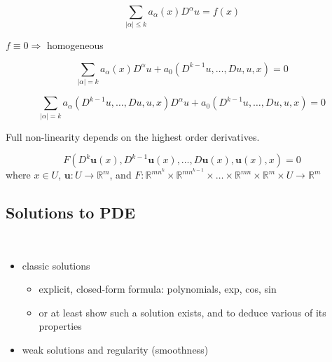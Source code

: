 \documentclass{article}
\begin{document}
\begin{definition}
    \begin{equation}
        \label{eq:linear-pde}
        \sum_{|\alpha| \leq k} a_{\alpha}(x) D^{\alpha} u = f(x)
    \end{equation}

    $f \equiv 0 \Rightarrow$ homogeneous
\end{definition}

\begin{definition}
    \begin{equation}
        \label{eq:semi-linear}
        \sum_{|\alpha| = k} a_{\alpha}(x) D^{\alpha}u + a_{0} (D^{k-1}u, \dots, Du, u, x) = 0
    \end{equation}
\end{definition}

\begin{definition}
    \begin{equation}
        \label{eq:quasi-linear}
        \sum_{|\alpha| = k} a_{\alpha}(D^{k-1}u, \dots, Du, u, x) D^{\alpha}u + a_{0} (D^{k-1}u, \dots, Du, u, x) = 0
    \end{equation}
\end{definition}

\begin{remark}[nonlinear]
    Full non-linearity depends on the highest order derivatives.
\end{remark}

\begin{definition}
    \begin{equation}
        \label{eq:pde-system}
        F(D^{k}\boldsymbol{u}(x), D^{k-1}\boldsymbol{u}(x), \dots, D\boldsymbol{u}(x), \boldsymbol{u}(x), x) = 0
    \end{equation}
    where $x \in U$, $\boldsymbol{u} : U \to \mathbb{R}^{m}$, and $F : \mathbb{R}^{mn^{k}} \times \mathbb{R}^{mn^{k-1}} \times \dots \times \mathbb{R}^{mn} \times \mathbb{R}^{m} \times U \to \mathbb{R}^{m}$
\end{definition}

\subsection{Solutions to PDE}
\begin{definition}~
    \begin{itemize}
        \item classic solutions
              \begin{itemize}
                  \item explicit, closed-form formula: polynomials, exp, cos, sin
                  \item or at least show such a solution exists, and to deduce various of its properties
              \end{itemize}
        \item weak solutions and regularity (smoothness)
    \end{itemize}
\end{definition}
\end{document}
